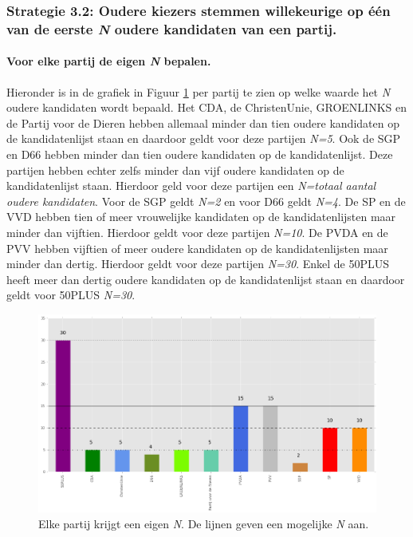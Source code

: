 \subsubsection{Strategie 3.2: Oudere kiezers stemmen willekeurige op één van de eerste \textit{N} oudere kandidaten van een partij.}


\paragraph{Voor elke partij de eigen \textit{N} bepalen.}
Hieronder is in de grafiek in Figuur \ref{fig:XO} per partij te zien op welke waarde het \textit{N} oudere kandidaten wordt bepaald. Het CDA, de ChristenUnie, GROENLINKS en de Partij voor de Dieren hebben allemaal minder dan tien oudere kandidaten op de kandidatenlijst staan en daardoor geldt voor deze partijen \textit{N=5}. Ook de SGP en D66 hebben minder dan tien oudere kandidaten op de kandidatenlijst. Deze partijen hebben echter zelfs minder dan vijf oudere kandidaten op de kandidatenlijst staan. Hierdoor geld voor deze partijen een \textit{N=totaal aantal oudere kandidaten}. Voor de SGP geldt \textit{N=2} en voor D66 geldt \textit{N=4}. De SP en de VVD hebben tien of meer vrouwelijke kandidaten op de kandidatenlijsten maar minder dan vijftien. Hierdoor geldt voor deze partijen \textit{N=10}. De PVDA en de PVV hebben vijftien of meer oudere kandidaten op de kandidatenlijsten maar minder dan dertig. Hierdoor geldt voor deze partijen \textit{N=30}. Enkel de 50PLUS heeft meer dan dertig oudere kandidaten op de kandidatenlijst staan en daardoor geldt voor 50PLUS \textit{N=30}. 

\begin{figure}[H]

	\includegraphics[width=\linewidth]{eigenX_partijen_ouderen.png}
		\caption{Elke partij krijgt een eigen \textit{N}. De lijnen geven een mogelijke \textit{N} aan.}

\label{fig:XO}
\end{figure}





